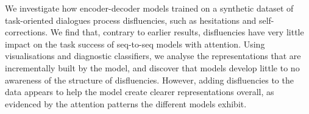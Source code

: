 We investigate how encoder-decoder models trained on a synthetic dataset of task-oriented dialogues process disfluencies, such as hesitations and self-corrections. We find that, contrary to earlier results, disfluencies have very little impact on the task success of seq-to-seq models with attention. Using visualisations and diagnostic classifiers, we analyse the representations that are incrementally built by the model, and discover that models develop little to no awareness of the structure of disfluencies. However, adding disfluencies to the data appears to help the model create clearer representations overall, as evidenced by the attention patterns the different models exhibit.
